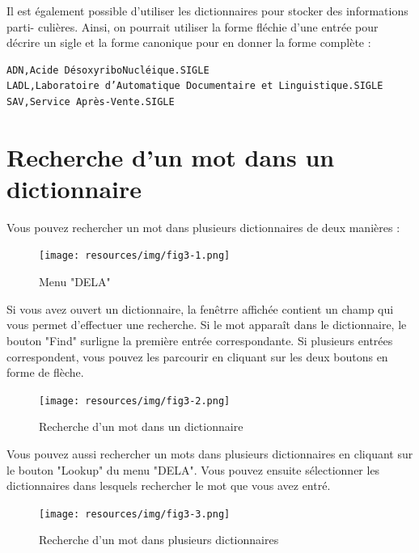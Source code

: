 Il est également possible d’utiliser les dictionnaires pour stocker des informations parti-
culières. Ainsi, on pourrait utiliser la forme fléchie d’une entrée pour décrire un sigle et la
forme canonique pour en donner la forme complète :

\bigskip
\begin{verbatim}
ADN,Acide DésoxyriboNucléique.SIGLE
LADL,Laboratoire d’Automatique Documentaire et Linguistique.SIGLE
SAV,Service Après-Vente.SIGLE
\end{verbatim}



\section{Recherche d'un mot dans un dictionnaire}
\label{section-dictionary-lookup}
Vous pouvez rechercher un mot dans plusieurs dictionnaires de deux manières : 

\begin{figure}[!ht]
\begin{center}
\texttt{[image: resources/img/fig3-1.png]}
\caption{Menu "DELA"}
\end{center}
\end{figure}

\bigskip
\noindent
Si vous avez ouvert un dictionnaire, la fenêtrre affichée contient un champ qui vous permet
d'effectuer une recherche. Si le mot apparaît dans le dictionnaire, le bouton "Find" surligne la
première entrée correspondante. Si plusieurs entrées correspondent, vous pouvez les parcourir en
cliquant sur les deux boutons en forme de flèche.

\begin{figure}[!ht]
\begin{center}
\texttt{[image: resources/img/fig3-2.png]}
\caption{Recherche d'un mot dans un dictionnaire}
\end{center}
\end{figure}

\bigskip
\noindent
Vous pouvez aussi rechercher un mots dans plusieurs dictionnaires en cliquant sur le bouton "Lookup" du menu "DELA". Vous pouvez ensuite sélectionner les dictionnaires dans lesquels rechercher le mot que vous avez entré.

\begin{figure}[!ht]
\begin{center}
\texttt{[image: resources/img/fig3-3.png]}
\caption{Recherche d'un mot dans plusieurs dictionnaires}
\end{center}
\end{figure}

